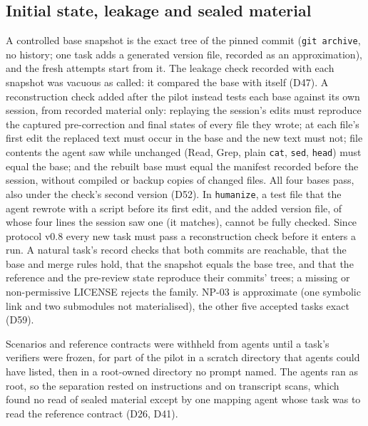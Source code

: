 \subsection{Initial state, leakage and sealed material}
\label{sec:initial-state}
A controlled base snapshot is the exact tree of the pinned commit (\texttt{git archive}, no history; one task adds a generated version file, recorded as an approximation), and the fresh attempts start from it. The leakage check recorded with each snapshot was vacuous as called: it compared the base with itself (D47). A reconstruction check added after the pilot instead tests each base against its own session, from recorded material only: replaying the session's edits must reproduce the captured pre-correction and final states of every file they wrote; at each file's first edit the replaced text must occur in the base and the new text must not; file contents the agent saw while unchanged (Read, Grep, plain \texttt{cat}, \texttt{sed}, \texttt{head}) must equal the base; and the rebuilt base must equal the manifest recorded before the session, without compiled or backup copies of changed files. All four bases pass, also under the check's second version (D52). In \texttt{humanize}, a test file that the agent rewrote with a script before its first edit, and the added version file, of whose four lines the session saw one (it matches), cannot be fully checked. Since protocol v0.8 every new task must pass a reconstruction check before it enters a run. A natural task's record checks that both commits are reachable, that the base and merge rules hold, that the snapshot equals the base tree, and that the reference and the pre-review state reproduce their commits' trees; a missing or non-permissive LICENSE rejects the family. NP-03 is approximate (one symbolic link and two submodules not materialised), the other five accepted tasks exact (D59).

Scenarios and reference contracts were withheld from agents until a task's verifiers were frozen, for part of the pilot in a scratch directory that agents could have listed, then in a root-owned directory no prompt named. The agents ran as root, so the separation rested on instructions and on transcript scans, which found no read of sealed material except by one mapping agent whose task was to read the reference contract (D26, D41).

